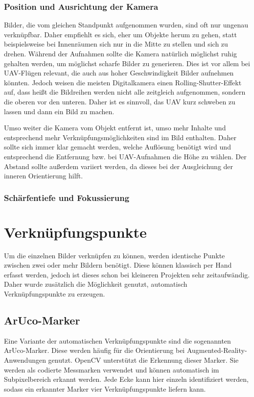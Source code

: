 \documentclass[./00_PhotoBox.tex]{subfiles}
\begin{document}
\subsubsection{Position und Ausrichtung der Kamera}
Bilder, die vom gleichen Standpunkt aufgenommen wurden, sind oft nur ungenau verknüpfbar. Daher empfiehlt es sich, eher um Objekte herum zu gehen, statt beispielsweise bei Innenräumen sich nur in die Mitte zu stellen und sich zu drehen. Während der Aufnahmen sollte die Kamera natürlich möglichst ruhig gehalten werden, um möglichst scharfe Bilder zu generieren. Dies ist vor allem bei UAV-Flügen relevant, die auch aus hoher Geschwindigkeit Bilder aufnehmen könnten. Jedoch weisen die meisten Digitalkamera einen Rolling-Shutter-Effekt auf, dass heißt die Bildreihen werden nicht alle zeitgleich aufgenommen, sondern die oberen vor den unteren. Daher ist es sinnvoll, das UAV kurz schweben zu lassen und dann ein Bild zu machen. \citep[S. 147]{opendronemap}

Umso weiter die Kamera vom Objekt entfernt ist, umso mehr Inhalte und entsprechend mehr Verknüpfungsmöglichkeiten sind im Bild enthalten. Daher sollte sich immer klar gemacht werden, welche Auflösung benötigt wird und entsprechend die Entfernung bzw. bei UAV-Aufnahmen die Höhe zu wählen. Der Abstand sollte außerdem variiert werden, da dieses bei der Ausgleichung der inneren Orientierung hilft. \citep[S. 144f]{opendronemap}

\subsubsection{Schärfentiefe und Fokussierung}


\section{Verknüpfungspunkte}
Um die einzelnen Bilder verknüpfen zu können, werden identische Punkte zwischen zwei oder mehr Bildern benötigt. Diese können klassisch per Hand erfasst werden, jedoch ist dieses schon bei kleineren Projekten sehr zeitaufwändig. Daher wurde zusätzlich die Möglichkeit genutzt, automatisch Verknüpfungspunkte zu erzeugen.

\subsection{ArUco-Marker}
Eine Variante der automatischen Verknüpfungspunkte sind die sogenannten ArUco-Marker. Diese werden häufig für die Orientierung bei Augmented-Reality-Anwend\-ungen genutzt. OpenCV unterstützt die Erkennung dieser Marker. Sie werden als codierte Messmarken verwendet und können automatisch im Subpixelbereich erkannt werden. Jede Ecke kann hier einzeln identifiziert werden, sodass ein erkannter Marker vier Verknüpfungspunkte liefern kann.
\end{document}
